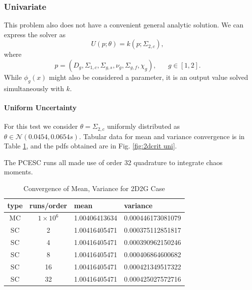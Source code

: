 \subsubsection{Univariate}
This problem also does not have a convenient general analytic solution.  We can express the solver as
\begin{equation}
U(p;\theta) = k(p;\Sigma_{2,c}),
\end{equation}
where
\begin{equation}
p=(D_g,\Sigma_{1,c},\Sigma_{g,s},\nu_g,\Sigma_{g,f},\chi_g),\hspace{20pt}g\in[1,2].
\end{equation}
While $\phi_g(x)$ might also be considered a parameter, it is an output value solved simultaneously with $k$.

\paragraph{Uniform Uncertainty}
For this test we consider $\theta=\Sigma_{2,c}$ uniformly distributed as $\theta\in\mathcal{N}(0.0454,0.0654s)$. Tabular data for mean and variance convergence is in Table \ref{tab:2dcrit uni}, and the pdfs obtained are in Fig. \ref{fig:2dcrit uni}.

The PCESC runs all made use of order 32 quadrature to integrate chaos moments.

\begin{table}[H]
\begin{center}
\begin{tabular}{c c|l l}
type & runs/order & mean & variance \\ \hline
MC & $1\times10^6$ & 1.00406413634 & 0.000446173081079 \\
SC & 2  & 1.00416405471 & 0.000375112851817 \\
SC & 4  & 1.00416405471 & 0.000390962150246 \\
SC & 8  & 1.00416405471 & 0.000406864600682 \\
SC & 16 & 1.00416405471 & 0.000421349517322 \\
SC & 32 & 1.00416405471 & 0.000425027572716
\end{tabular}
\end{center}
\caption{Convergence of Mean, Variance for 2D2G Case}
\label{tab:2dcrit uni}
\end{table}

